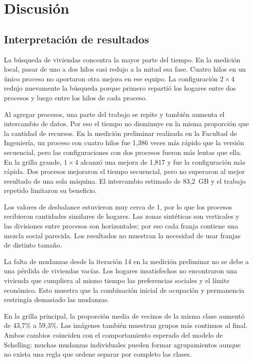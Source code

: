 \section{Discusión}

\subsection{Interpretación de resultados}

La búsqueda de viviendas concentra la mayor parte del tiempo. En la medición local, pasar de uno a dos hilos casi redujo a la mitad esa fase. Cuatro hilos en un único proceso no aportaron otra mejora en ese equipo. La configuración $2\times4$ redujo nuevamente la búsqueda porque primero repartió los hogares entre dos procesos y luego entre los hilos de cada proceso.

Al agregar procesos, una parte del trabajo se repite y también aumenta el intercambio de datos. Por eso el tiempo no disminuye en la misma proporción que la cantidad de recursos. En la medición preliminar realizada en la Facultad de Ingeniería, un proceso con cuatro hilos fue 1,386 veces más rápido que la versión secuencial, pero las configuraciones con dos procesos fueron más lentas que ella. En la grilla grande, $1\times4$ alcanzó una mejora de 1,817 y fue la configuración más rápida. Dos procesos mejoraron el tiempo secuencial, pero no superaron al mejor resultado de una sola máquina. El intercambio estimado de 83,2~GB y el trabajo repetido limitaron su beneficio.

Los valores de desbalance estuvieron muy cerca de 1, por lo que los procesos recibieron cantidades similares de hogares. Las zonas sintéticas son verticales y las divisiones entre procesos son horizontales; por eso cada franja contiene una mezcla social parecida. Los resultados no muestran la necesidad de usar franjas de distinto tamaño.

La falta de mudanzas desde la iteración 14 en la medición preliminar no se debe a una pérdida de viviendas vacías. Los hogares insatisfechos no encontraron una vivienda que cumpliera al mismo tiempo las preferencias sociales y el límite económico. Esto muestra que la combinación inicial de ocupación y permanencia restringía demasiado las mudanzas.

En la grilla principal, la proporción media de vecinos de la misma clase aumentó de 43,7\% a 59,3\%. Las imágenes también muestran grupos más continuos al final. Ambos cambios coinciden con el comportamiento esperado del modelo de Schelling: muchas mudanzas individuales pueden formar agrupamientos aunque no exista una regla que ordene separar por completo las clases.

